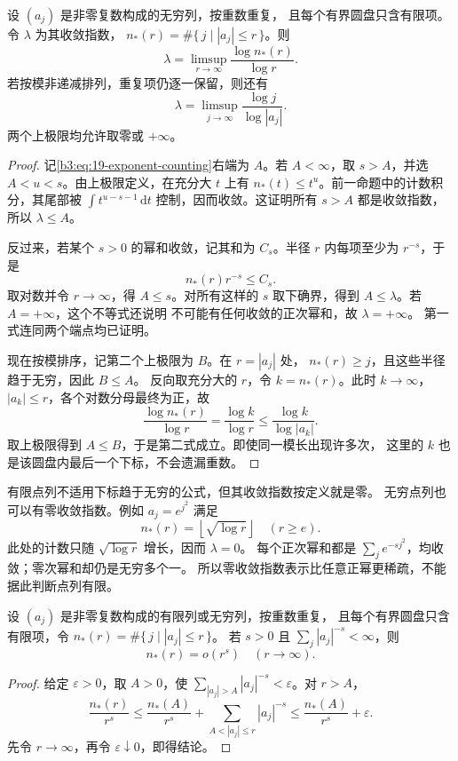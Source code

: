 \begin{theorem}[收敛指数的计数公式]\label{b3:thm:19-convergence-exponent}
设 \((a_j)\) 是非零复数构成的无穷列，按重数重复，
且每个有界圆盘只含有限项。令 \(\lambda\) 为其收敛指数，
\(n_*(r)=\#\{\,j\mid |a_j|\le r\,\}\)。则
\begin{equation}\label{b3:eq:19-exponent-counting}
 \lambda=\limsup_{r\to\infty}\frac{\log n_*(r)}{\log r}.
\end{equation}
若按模非递减排列，重复项仍逐一保留，则还有
\begin{equation}\label{b3:eq:19-exponent-enumeration}
 \lambda=\limsup_{j\to\infty}\frac{\log j}{\log|a_j|}.
\end{equation}
两个上极限均允许取零或 \(+\infty\)。
\end{theorem}
\begin{proof}
记\eqref{b3:eq:19-exponent-counting}右端为 \(A\)。若 \(A<\infty\)，取
\(s>A\)，并选 \(A<u<s\)。由上极限定义，在充分大 \(t\) 上有
\(n_*(t)\le t^u\)。前一命题中的计数积分，其尾部被
\(\int t^{u-s-1}\,\mathrm dt\) 控制，因而收敛。这证明所有 \(s>A\)
都是收敛指数，所以 \(\lambda\le A\)。

反过来，若某个 \(s>0\) 的幂和收敛，记其和为 \(C_s\)。半径 \(r\)
内每项至少为 \(r^{-s}\)，于是
\[
 n_*(r)r^{-s}\le C_s.
\]
取对数并令 \(r\to\infty\)，得 \(A\le s\)。对所有这样的 \(s\)
取下确界，得到 \(A\le\lambda\)。若 \(A=+\infty\)，这个不等式还说明
不可能有任何收敛的正次幂和，故 \(\lambda=+\infty\)。
第一式连同两个端点均已证明。

现在按模排序，记第二个上极限为 \(B\)。在 \(r=|a_j|\) 处，
\(n_*(r)\ge j\)，且这些半径趋于无穷，因此 \(B\le A\)。
反向取充分大的 \(r\)，令 \(k=n_*(r)\)。此时 \(k\to\infty\)，
\(|a_k|\le r\)，各个对数分母最终为正，故
\[
 \frac{\log n_*(r)}{\log r}
 =\frac{\log k}{\log r}
 \le\frac{\log k}{\log|a_k|}.
\]
取上极限得到 \(A\le B\)，于是第二式成立。即使同一模长出现许多次，
这里的 \(k\) 也是该圆盘内最后一个下标，不会遗漏重数。
\end{proof}

有限点列不适用下标趋于无穷的公式，但其收敛指数按定义就是零。
无穷点列也可以有零收敛指数。例如 \(a_j=e^{j^2}\) 满足
\[
 n_*(r)=\left\lfloor\sqrt{\log r}\right\rfloor\quad(r\ge e).
\]
此处的计数只随 \(\sqrt{\log r}\) 增长，因而 \(\lambda=0\)。
每个正次幂和都是 \(\sum_j e^{-sj^2}\)，均收敛；零次幂和却仍是无穷多个一。
所以零收敛指数表示比任意正幂更稀疏，不能据此判断点列有限。

\begin{corollary}[幂和收敛与小量计数]\label{b3:cor:19-summable-small-count}
设 \((a_j)\) 是非零复数构成的有限列或无穷列，按重数重复，
且每个有界圆盘只含有限项，令 \(n_*(r)=\#\{\,j\mid |a_j|\le r\,\}\)。
若 \(s>0\) 且 \(\sum_j|a_j|^{-s}<\infty\)，则
\[
 n_*(r)=o(r^s)\quad(r\to\infty).
\]
\end{corollary}
\begin{proof}
给定 \(\varepsilon>0\)，取 \(A>0\)，使
\(\sum_{|a_j|>A}|a_j|^{-s}<\varepsilon\)。对 \(r>A\)，
\[
 \frac{n_*(r)}{r^s}
 \le\frac{n_*(A)}{r^s}
       +\sum_{A<|a_j|\le r}|a_j|^{-s}
 \le\frac{n_*(A)}{r^s}+\varepsilon.
\]
先令 \(r\to\infty\)，再令 \(\varepsilon\downarrow0\)，即得结论。
\end{proof}

